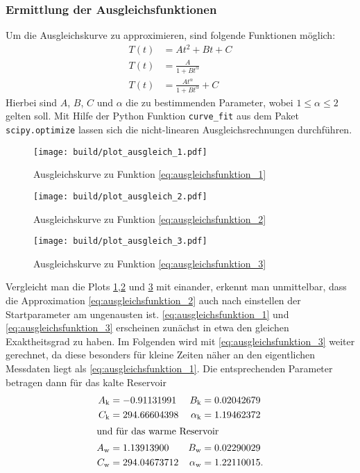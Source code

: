\subsubsection[]{Ermittlung der Ausgleichsfunktionen}
Um die Ausgleichskurve zu approximieren, sind folgende Funktionen möglich:
\begin{align}
    T \left(t\right) &= A t^2 + B t + C \label{eq:ausgleichsfunktion_1} \\
    T \left(t\right) &= \frac{A}{1 + B t^{\alpha}} \label{eq:ausgleichsfunktion_2} \\
    T \left(t\right) &= \frac{A t^{\alpha}}{1 + B t^{\alpha}} + C \label{eq:ausgleichsfunktion_3}
\end{align}
Hierbei sind $A$, $B$, $C$ und $\alpha$ die zu bestimmenden Parameter, wobei $1 \leq \alpha \leq 2$ gelten soll.
Mit Hilfe der Python \cite[]{python} Funktion \texttt{curve\_fit} aus dem Paket \texttt{scipy.optimize} 
\cite[]{scipy} lassen sich die nicht-linearen Ausgleichsrechnungen durchführen.
\begin{figure}
    \texttt{[image: build/plot\_ausgleich\_1.pdf]}
    \caption[]{Ausgleichskurve zu Funktion \eqref{eq:ausgleichsfunktion_1}}
    \label{fig:ausgleichsplot_1}
\end{figure}
\begin{figure}
    \texttt{[image: build/plot\_ausgleich\_2.pdf]}
    \caption[]{Ausgleichskurve zu Funktion \eqref{eq:ausgleichsfunktion_2}}
    \label{fig:ausgleichsplot_2}
\end{figure}
\begin{figure}
    \texttt{[image: build/plot\_ausgleich\_3.pdf]}
    \caption[]{Ausgleichskurve zu Funktion \eqref{eq:ausgleichsfunktion_3}}
    \label{fig:ausgleichsplot_3}
\end{figure}
Vergleicht man die Plots \ref{fig:ausgleichsplot_1},\ref{fig:ausgleichsplot_2} und \ref{fig:ausgleichsplot_3} mit einander,
erkennt man unmittelbar, dass die Approximation \eqref{eq:ausgleichsfunktion_2} auch nach einstellen der Startparameter am ungenausten ist.
\eqref{eq:ausgleichsfunktion_1} und \eqref{eq:ausgleichsfunktion_3} erscheinen zunächst in etwa den gleichen Exaktheitsgrad zu haben.
Im Folgenden wird mit \eqref{eq:ausgleichsfunktion_3} weiter gerechnet, da diese besonders für kleine Zeiten näher an den eigentlichen Messdaten liegt
als \eqref{eq:ausgleichsfunktion_1}.
Die entsprechenden Parameter betragen dann für das kalte Reservoir
\begin{align*}
    A_{\text{k}} &= -0.91131991 & B_{\text{k}} &= 0.02042679 \\
    C_{\text{k}} &= 294.66604398 & \alpha_{\text{k}} &= 1.19462372 \\
    \intertext{und für das warme Reservoir}
    A_{\text{w}} &= 1.13913900 & B_{\text{w}} &= 0.02290029 \\
    C_{\text{w}} &= 294.04673712 & \alpha_{\text{w}} &= 1.22110015.
\end{align*}

